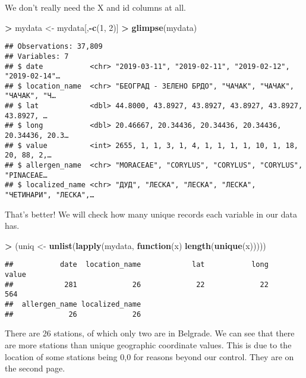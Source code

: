 \documentclass[
]{article}
\newenvironment{Shaded}{\begin{snugshade}}{\end{snugshade}}
\newcommand{\ControlFlowTok}[1]{\textcolor[rgb]{0.13,0.29,0.53}{\textbf{#1}}}
\newcommand{\DecValTok}[1]{\textcolor[rgb]{0.00,0.00,0.81}{#1}}
\newcommand{\KeywordTok}[1]{\textcolor[rgb]{0.13,0.29,0.53}{\textbf{#1}}}
\newcommand{\NormalTok}[1]{#1}
\newcommand{\OperatorTok}[1]{\textcolor[rgb]{0.81,0.36,0.00}{\textbf{#1}}}
\newcommand{\StringTok}[1]{\textcolor[rgb]{0.31,0.60,0.02}{#1}}
\begin{document}
We don't really need the X and id columns at all.

\begin{Shaded}
\begin{Highlighting}[]
\OperatorTok{>}\StringTok{ }\NormalTok{mydata <{-}}\StringTok{ }\NormalTok{mydata[,}\OperatorTok{{-}}\KeywordTok{c}\NormalTok{(}\DecValTok{1}\NormalTok{, }\DecValTok{2}\NormalTok{)]}
\OperatorTok{>}\StringTok{ }\KeywordTok{glimpse}\NormalTok{(mydata)}
\end{Highlighting}
\end{Shaded}

\begin{verbatim}
## Observations: 37,809
## Variables: 7
## $ date           <chr> "2019-03-11", "2019-02-11", "2019-02-12", "2019-02-14"…
## $ location_name  <chr> "БЕОГРАД - ЗЕЛЕНО БРДО", "ЧАЧАК", "ЧАЧАК", "ЧАЧАК", "Ч…
## $ lat            <dbl> 44.8000, 43.8927, 43.8927, 43.8927, 43.8927, 43.8927, …
## $ long           <dbl> 20.46667, 20.34436, 20.34436, 20.34436, 20.34436, 20.3…
## $ value          <int> 2655, 1, 1, 3, 1, 4, 1, 1, 1, 1, 10, 1, 18, 20, 88, 2,…
## $ allergen_name  <chr> "MORACEAE", "CORYLUS", "CORYLUS", "CORYLUS", "PINACEAE…
## $ localized_name <chr> "ДУД", "ЛЕСКА", "ЛЕСКА", "ЛЕСКА", "ЧЕТИНАРИ", "ЛЕСКА",…
\end{verbatim}

That's better! We will check how many unique records each variable in
our data has.

\begin{Shaded}
\begin{Highlighting}[]
\OperatorTok{>}\StringTok{ }\NormalTok{(uniq <{-}}\StringTok{ }\KeywordTok{unlist}\NormalTok{(}\KeywordTok{lapply}\NormalTok{(mydata, }\ControlFlowTok{function}\NormalTok{(x) }\KeywordTok{length}\NormalTok{(}\KeywordTok{unique}\NormalTok{(x)))))}
\end{Highlighting}
\end{Shaded}

\begin{verbatim}
##           date  location_name            lat           long          value 
##            281             26             22             22            564 
##  allergen_name localized_name 
##             26             26
\end{verbatim}

There are 26 stations, of which only two are in Belgrade. We can see
that there are more stations than unique geographic coordinate values.
This is due to the location of some stations being 0,0 for reasons
beyond our control. They are on the second page.
\end{document}
